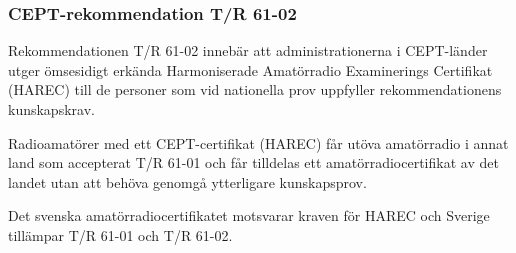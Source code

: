 \subsubsection{CEPT-rekommendation T/R 61-02}

Rekommendationen T/R 61-02 \cite{TR6102} innebär att administrationerna i
CEPT-länder utger ömsesidigt erkända Harmoniserade Amatörradio Examinerings
Certifikat (HAREC) till de personer som vid nationella prov uppfyller
rekommendationens kunskapskrav.

Radioamatörer med ett CEPT-certifikat (HAREC) får utöva amatörradio i annat land
som accepterat T/R 61-01 och får tilldelas ett amatörradiocertifikat av det
landet utan att behöva genomgå ytterligare kunskapsprov.

Det svenska amatörradiocertifikatet motsvarar kraven för HAREC och Sverige
tillämpar T/R 61-01 och T/R 61-02.